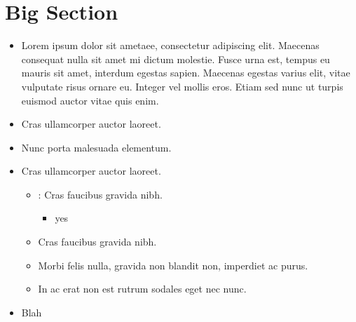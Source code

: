 \documentclass[12pt,a4paper]{report}
\begin{document}
\section{Big Section}
\begin{itemize}
    \item Lorem ipsum dolor sit {\color{o-Sun}ametaee}, consectetur adipiscing elit. Maecenas consequat nulla sit amet mi dictum molestie. Fusce urna est, tempus eu mauris sit amet, interdum egestas sapien. Maecenas egestas varius elit, vitae vulputate risus ornare eu. Integer vel mollis eros. Etiam sed nunc ut turpis euismod auctor vitae quis enim.
        \item Cras ullamcorper auctor laoreet. 
        \item Nunc porta malesuada elementum. 
        \item Cras ullamcorper auctor laoreet.
    \begin{itemize}
    \subsection{Mini Section}
        \item {}: Cras faucibus gravida nibh.
            \begin{itemize}
                \item yes
            \end{itemize}
        \item  Cras faucibus gravida nibh.
        \item  Morbi felis nulla, gravida non blandit non, imperdiet ac purus.
        \item  In ac erat non est rutrum sodales eget nec nunc.
    \end{itemize}
    \item Blah
\end{itemize}
\end{document}
